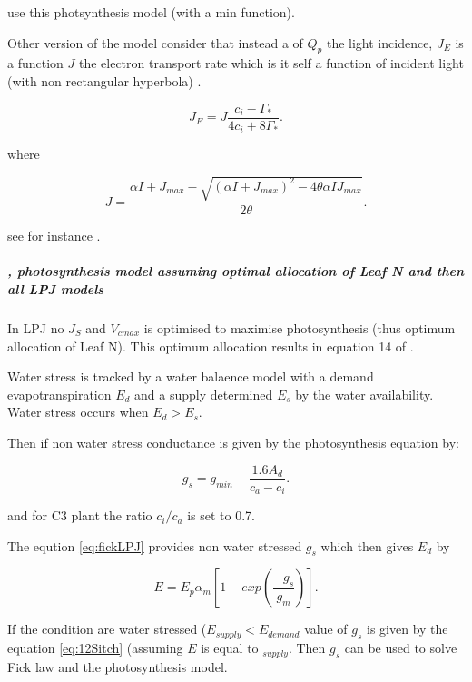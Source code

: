 \documentclass[a4paper,11pt]{article}
\begin{document}
\citet{Scheiter-2009} use this photsynthesis model (with a min function).

Other version of the model consider that instead a of $Q_p$ the light incidence, $J_E$ is a function $J$ the electron transport rate which is it self a function of incident light (with non rectangular hyperbola) \citep{Sharkey-2007}.

\begin{equation}
\label{eq:JCb}
J_E = J \frac{ c_i - \Gamma_*}{4c_i + 8 \Gamma_*}.
\end{equation}

where

\begin{equation}
\label{eq:Jlight}
J = \frac{ \alpha I + J_{max} - \sqrt{(\alpha I + J_{max})^2 - 4 \theta \alpha I J_{max}}}{2\theta}.
\end{equation}

see for instance \citet{Bernacchi-2009}.


\subparagraph{\citet{Haxeltine-1996}, photosynthesis model assuming optimal allocation of Leaf N and then all LPJ models}

In LPJ no $J_S$ and $V_{cmax}$ is optimised to maximise photosynthesis (thus optimum allocation of Leaf N). This optimum allocation results in equation 14 of \citet{Sitch-2008}.

Water stress is tracked by a water balaence model with a demand evapotranspiration $E_d$ and a supply determined $E_s$ by the water availability. Water stress occurs when $E_d > E_s$.

Then if non water stress conductance is given by the photosynthesis equation by:

\begin{equation}
\label{eq:fickLPJ}
g_s=g_{min} + \frac{1.6A_d}{c_a - c_i}.
\end{equation}

and for C3 plant the ratio $c_i / c_a$ is set to 0.7.

The eqution \ref{eq:fickLPJ} provides non water stressed $g_s$ which then gives $E_{d}$ by

\begin{equation}
\label{eq:12Sitch}
E=E_p \alpha_m [1 - exp(\frac{- g_s}{g_m})].
\end{equation}

If the condition are water stressed ($E_{supply} < E_{demand}$ value
of $g_s$ is given by the equation \ref{eq:12Sitch} (assuming $E$ is
equal to $_{supply}$. Then $g_s$ can be used to solve Fick law and the
photosynthesis model.
\end{document}
